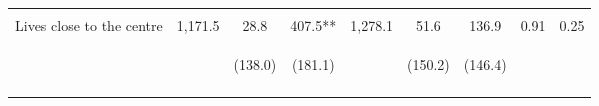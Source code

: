 \begin{table}[h!]
{\begin{tabular}{lcccccccc}
 & \begin{footnotesize}\end{footnotesize} & \begin{footnotesize}[1.000]\end{footnotesize} & \begin{footnotesize}[0.036]\end{footnotesize} & \begin{footnotesize}\end{footnotesize} & \begin{footnotesize}[1.000]\end{footnotesize} & \begin{footnotesize}[0.632]\end{footnotesize} & \begin{footnotesize}\end{footnotesize} & \begin{footnotesize}\end{footnotesize}\\
\noalign{\smallskip}Lives close to the centre & 1,171.5 & 28.8 & 407.5** & 1,278.1 & 51.6 & 136.9 & 0.91 & 0.25\\
 & \begin{footnotesize}\end{footnotesize} & \begin{footnotesize}(138.0)\end{footnotesize} & \begin{footnotesize}(181.1)\end{footnotesize} & \begin{footnotesize}\end{footnotesize} & \begin{footnotesize}(150.2)\end{footnotesize} & \begin{footnotesize}(146.4)\end{footnotesize} & \begin{footnotesize}\end{footnotesize} & \begin{footnotesize}\end{footnotesize}\\
 & \begin{footnotesize}\end{footnotesize} & \begin{footnotesize}[1.000]\end{footnotesize} & \begin{footnotesize}[0.036]\end{footnotesize} & \begin{footnotesize}\end{footnotesize} & \begin{footnotesize}[1.000]\end{footnotesize} & \begin{footnotesize}[0.632]\end{footnotesize} & \begin{footnotesize}\end{footnotesize} & \begin{footnotesize}\end{footnotesize}\\

\end{tabular}}
\end{table}
